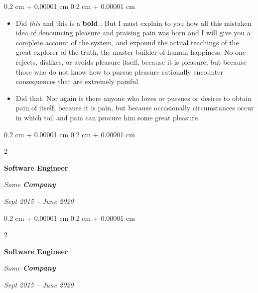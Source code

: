 \documentclass[10pt, letterpaper]{article}
\newenvironment{highlights}{
    \begin{itemize}[
        topsep=0.10 cm,
        parsep=0.10 cm,
        partopsep=0pt,
        itemsep=0pt,
        leftmargin=0.4 cm + 10pt
    ]
}{
    \end{itemize}
} %
\newenvironment{onecolentry}{
    \begin{adjustwidth}{
        0.2 cm + 0.00001 cm
    }{
        0.2 cm + 0.00001 cm
    }
}{
    \end{adjustwidth}
} %
\newenvironment{twocolentry}[2][]{
    \onecolentry
    \def\secondColumn{#2}
    \setcolumnwidth{\fill, 4.5 cm}
    \begin{paracol}{2}
}{
    \switchcolumn \raggedleft \secondColumn
    \end{paracol}
    \endonecolentry
} %
\let\hrefWithoutArrow\href
\renewcommand{\href}[2]{\hrefWithoutArrow{#1}{\ifthenelse{\equal{#2}{}}{ }{#2 }\raisebox{.15ex}{\footnotesize \faExternalLink*}}}
\begin{document}
        \vspace{0.10 cm}
        \begin{onecolentry}
            \begin{highlights}
                \item Did \textit{this} and this is a \textbf{bold} \href{https://example.com}{link}. But I must explain to you how all this mistaken idea of denouncing pleasure and praising pain was born and I will give you a complete account of the system, and expound the actual teachings of the great explorer of the truth, the master-builder of human happiness. No one rejects, dislikes, or avoids pleasure itself, because it is pleasure, but because those who do not know how to pursue pleasure rationally encounter consequences that are extremely painful.
                \item Did that. Nor again is there anyone who loves or pursues or desires to obtain pain of itself, because it is pain, but because occasionally circumstances occur in which toil and pain can procure him some great pleasure.
            \end{highlights}
        \end{onecolentry}


        \vspace{0.2 cm}

        \begin{twocolentry}{
            
            
        \textit{Sept 2015 – June 2020}}
            \textbf{Software Engineer}
            
            \textit{Some \textbf{Company}}
        \end{twocolentry}



        \vspace{0.2 cm}

        \begin{twocolentry}{
            
            
        \textit{Sept 2015 – June 2020}}
            \textbf{Software Engineer}
            
            \textit{Some \textbf{Company}}
        \end{twocolentry}
\end{document}

